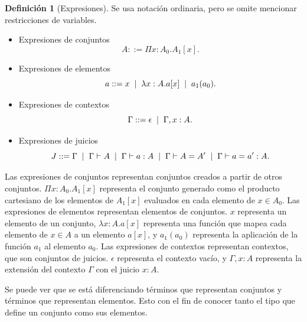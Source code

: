 \documentclass[11pt,oneside]{report}
\theoremstyle{plain}
\theoremstyle{definition}
\newtheorem{defi}{Definición}[chapter]
\begin{document}
\begin{defi}[Expresiones]
    Se usa notación ordinaria, pero se omite mencionar restricciones de variables.
    \begin{itemize}
        \item Expresiones de conjuntos
              $$A ::= \Pi x:A_{0}.A_{1}[x].$$
        \item Expresiones de elementos
              $$a ::= x \hspace{2mm}|\hspace{2mm} \lambda x:A.a[x] \hspace{2mm}|\hspace{2mm} a_1(a_0).$$
        \item Expresiones de contextos
              $$\Gamma ::= \epsilon \hspace{2mm}|\hspace{2mm} \Gamma, x:A.$$
        \item Expresiones de juicios
              $$J ::= \Gamma \hspace{2mm}|\hspace{2mm} \Gamma \vdash A \hspace{2mm}|\hspace{2mm} \Gamma \vdash a:A \hspace{2mm}|\hspace{2mm} \Gamma \vdash A = A' \hspace{2mm}|\hspace{2mm} \Gamma \vdash a = a':A.$$
    \end{itemize}
\end{defi}

Las expresiones de conjuntos representan conjuntos creados a partir de otros conjuntos. \(\Pi x:A_{0}.A_{1}[x]\) representa el conjunto generado como el producto cartesiano de los elementos de \(A_{1}[x]\) evaluados en cada elemento de \(x \in A_{0}\). Las expresiones de elementos representan elementos de conjuntos. \(x\) representa un elemento de un conjunto, \(\lambda x:A.a[x]\) representa una función que mapea cada elemento de \(x \in A\) a un elemento \(a[x]\), y \(a_1(a_0)\) representa la aplicación de la función \(a_1\) al elemento \(a_0\). Las expresiones de contextos representan contextos, que son conjuntos de juicios. \(\epsilon\) representa el contexto vacío, y \(\Gamma, x:A\) representa la extensión del contexto \(\Gamma\) con el juicio \(x:A\). 

Se puede ver que se está diferenciando términos que representan conjuntos y términos que representan elementos. Esto con el fin de conocer tanto el tipo que define un conjunto como sus elementos.
\end{document}

